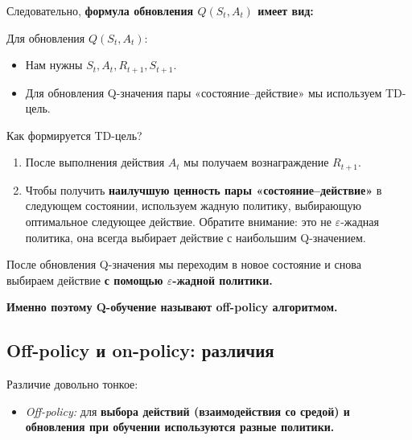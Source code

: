 \documentclass[11pt,a4paper]{article}
\begin{document}

Следовательно, \textbf{формула обновления \(Q(S_t,A_t)\) имеет вид:}


Для обновления \(Q(S_t,A_t)\):

\begin{itemize}
\tightlist
\item
  Нам нужны \(S_t,A_t,R_{t+1},S_{t+1}\).
\item
  Для обновления Q-значения пары «состояние--действие» мы используем TD-цель.
\end{itemize}

Как формируется TD-цель?

\begin{enumerate}
\def\labelenumi{\arabic{enumi}.}
\tightlist
\item
  После выполнения действия \(A_t\) мы получаем вознаграждение \(R_{t+1}\).
\item
  Чтобы получить \textbf{наилучшую ценность пары «состояние--действие»} в следующем состоянии, используем жадную политику, выбирающую оптимальное следующее действие. Обратите внимание: это не \(\varepsilon\)-жадная политика, она всегда выбирает действие с наибольшим Q-значением.
\end{enumerate}

После обновления Q-значения мы переходим в новое состояние и снова выбираем действие \textbf{с помощью \(\varepsilon\)-жадной политики.}

\textbf{Именно поэтому Q-обучение называют off-policy алгоритмом.}

\subsection{Off-policy и on-policy: различия}\label{off-policy-vs-on-policy}

Различие довольно тонкое:

\begin{itemize}
\tightlist
\item
  \emph{Off-policy:} для \textbf{выбора действий (взаимодействия со средой) и обновления при обучении используются разные политики.}
\end{itemize}
\end{document}
